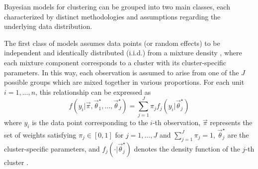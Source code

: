 \documentclass[12pt,	%
	a4paper,		%
	twoside,		%
	openright,		%
	titlepage,%
	]{book}
\theoremstyle{definition}
\let\cite\citep
\begin{document}
Bayesian models for clustering can be grouped into two main classes, each characterized by distinct methodologies and assumptions regarding the underlying data distribution.

The first class of models assumes data points (or random effects) to be independent and identically distributed (i.i.d.) from a mixture density \cite{mixture-1} \cite{mixture-2} \cite{mixture-3}, where each mixture component corresponds to a cluster with its cluster-specific parameters. In this way, each observation is assumed to arise from one of the $J$ possible groups which are mixed together in various proportions. For each unit $i=1,\ldots,n$, this relationship can be expressed as
\begin{equation}
f(y_i|\vec{\pi},\vec{\theta}^\star_1, \ldots, \vec{\theta}^\star_J)  = \sum_{j=1}^J \pi_j f_j(y_i|\vec{\theta}^\star_j) \label{mixture 1}
\end{equation}
where $y_i$ is the data point corresponding to the $i$-th observation, $\vec{\pi}$ represents the set of weights satisfying $\pi_j \in [0,1]$ for $j=1,\ldots,J$ and $\sum_{j=1}^J \pi_j=1$, $\vec{\theta}_j^\star$ are the cluster-specific parameters, and $f_j(\cdot|\vec{\theta}_j^\star)$ denotes the density function of the $j$-th cluster \cite{paper-33}. 
\end{document}
